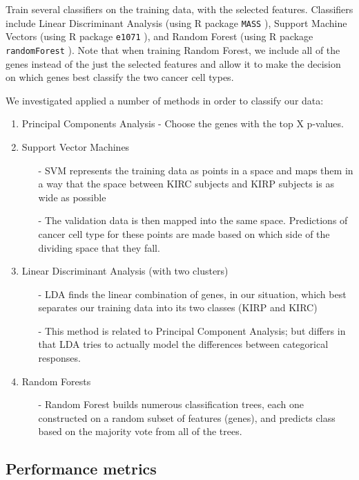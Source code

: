 Train several classifiers on the training data, with the selected
features. Classifiers include Linear Discriminant Analysis (using R package
\texttt{MASS} \cite{rclassmass}), Support Machine Vectors (using R package
\texttt{e1071} \cite{e1071}), and Random Forest (using R package
\texttt{randomForest} \cite{randforest}).  Note that when training Random
Forest, we include all of the genes instead of the just the selected features
and allow it to make the decision on which genes best classify the two cancer
cell types.

We investigated applied a number of methods in order to classify our data:

\begin{enumerate}
\item Principal Components Analysis - Choose the genes with the top X p-values. 
\item Support Vector Machines
\begin{itemize}
\item[-] SVM represents the training data as points in a space and maps them in a way
that the space between KIRC subjects and KIRP subjects is as wide as possible
\item[-] The validation data is then mapped into the same space. Predictions of cancer
cell type for these points are made based on which side of the dividing space that they fall. 
\end{itemize}
\item Linear Discriminant Analysis (with two clusters)
\begin{itemize}
\item[-] LDA finds the linear combination of genes, in our situation, which best separates our
training data into its two classes (KIRP and KIRC)
\item[-] This method is related to Principal Component Analysis; but differs in that LDA tries to
actually model the differences between categorical responses.
\end{itemize}
\item Random Forests
\begin{itemize}
\item[-] Random Forest builds numerous classification trees, each one constructed on a random subset of
features (genes), and predicts class based on the majority vote from all of the trees.
\end{itemize}
\end{enumerate}

\subsection*{Performance metrics}

